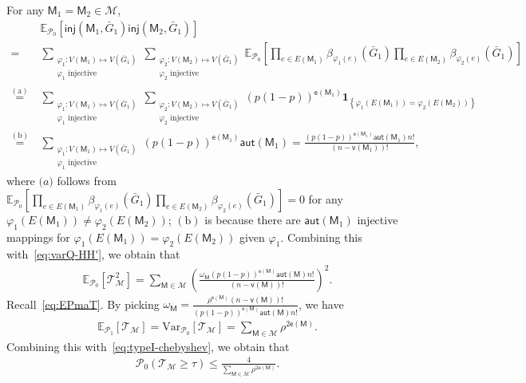 \documentclass[letterpaper,11pt]{article}
\theoremstyle{definition}
\newcommand{\maM}{\mathcal{M}}
\newcommand{\maP}{\mathcal{P}}
\newcommand{\maT}{\mathcal{T}}
\newcommand{\nbr}[1]{{\sf\color{red}[#1]}}
\newcommand{\en}{\mathsf{{e}}}
\newcommand{\vn}{\mathsf{{v}}}
\newcommand{\pth}[1]{\left( #1 \right)}
\newcommand{\qth}[1]{\left[ #1 \right]}
\newcommand{\sfM}{{\mathsf{M}}}
\newcommand{\indc}[1]{{\mathbf{1}_{\left\{{#1}\right\}}}}
\newcommand{\aut}{\mathsf{aut}}
\newcommand{\inj}{\mathsf{inj}}
\newcommand{\vp}{\varphi}
\def\var{\mathrm{Var}}
\def\E{\mathbb{E}}
\begin{document}
For any $\sfM_1 = \sfM_2\in \maM$, \begin{align*}
    &~\E_{\maP_0}\qth{\inj(\sfM_1,\bar{G}_1)\inj(\sfM_2,\bar{G}_1)} \\=&~ \sum_{\substack{\varphi_1:V(\sfM_1)\mapsto V(\bar{G}_1)\\\varphi_1\text{ injective}}}\sum_{\substack{\varphi_2:V(\sfM_2)\mapsto V(\bar{G}_1)\\\varphi_2\text{ injective}}} \E_{\maP_0}\qth{\prod_{e\in E(\sfM_1)} \beta_{\vp_1(e)}(\bar{G}_1)\prod_{e\in E(\sfM_2)}\beta_{\vp_2(e)}(\bar{G}_1)}\\
    \overset{\mathrm{(a)}}{=} &~\sum_{\substack{\varphi_1:V(\sfM_1)\mapsto V(\bar{G}_1)\\\varphi_1\text{ injective}}}\sum_{\substack{\varphi_2:V(\sfM_2)\mapsto V(\bar{G}_1)\\\varphi_2\text{ injective}}} (p(1-p))^{\en(\sfM_1)}\indc{\vp_1(E(\sfM_1)) = \vp_2(E(\sfM_2))} \\\overset{\mathrm{(b)}}{=}&~\sum_{\substack{\varphi_1:V(\sfM_1)\mapsto V(\bar{G}_1)\\\varphi_1\text{ injective}}} (p(1-p))^{\en(\sfM_1)} \aut(\sfM_1)=\frac{(p(1-p))^{\en(\sfM_1)} \aut(\sfM_1) n!}{(n-\vn(\sfM_1))!},
\end{align*}
where $\mathrm(a)$ follows from $\E_{\maP_0}\qth{{\prod_{e\in E(\sfM_1)} \beta_{\vp_1(e)}(\bar{G}_1)\prod_{e\in E(\sfM_2)}\beta_{\vp_2(e)}(\bar{G}_1)}}=0$ for any $\vp_1(E(\sfM_1))\neq \vp_2(E(\sfM_2))$; $\mathrm{(b)}$ is because there are $\aut(\sfM_1)$ injective mappings for $\vp_1(E(\sfM_1)) = \vp_2(E(\sfM_2))$ given $\vp_1$.
Combining this with~\eqref{eq:varQ-HH'}, we obtain that \begin{align*}
    \E_{\maP_0}\qth{\maT_{\maM}^2} = \sum_{\sfM\in\maM}\pth{\frac{\omega_\sfM(p(1-p))^{\en(\sfM)} \aut(\sfM) n!}{(n-\vn(\sfM))!}}^2.
\end{align*}
Recall~\eqref{eq:EPmaT}. By picking $\omega_\sfM = \frac{\rho^{\en(\sfM)} (n-\vn(\sfM))!}{(p(1-p))^{\en(\sfM)}\aut(\sfM) n!}$, %
we have \begin{align}\label{eq:EPvarQ}
    \E_{\maP_1}\qth{\maT_{\maM}} = \var_{\maP_0}\qth{\maT_{\maM}} = \sum_{\sfM\in \maM} \rho^{2\en(\sfM)}.
\end{align}
Combining this with~\eqref{eq:typeI-chebyshev}, we obtain that \begin{align*}
    {\maP_0}\pth{\maT_{\maM}\ge \tau}\le \frac{4}{\sum_{\sfM\in \maM} \rho^{2\en(\sfM)}}.
\end{align*}
\end{document}
